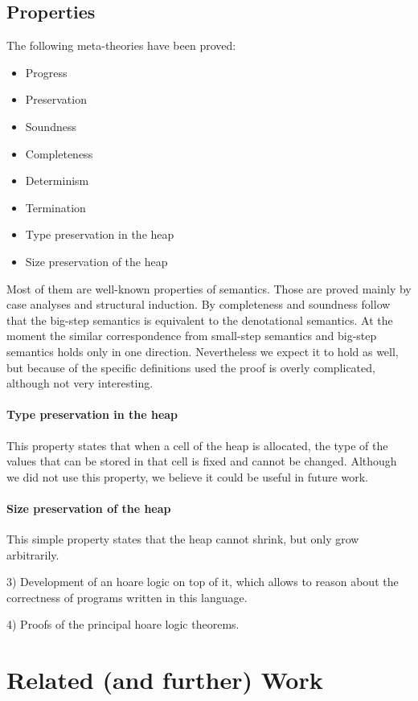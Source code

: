 \documentclass[12pt, a4paper, oneside]{article}
\begin{document}
\subsection{Properties}
\label{sec:metatheories}
The following meta-theories have been proved:
\begin{itemize}
	\item Progress
	\item Preservation
	\item Soundness
	\item Completeness
	\item Determinism
	\item Termination
	\item Type preservation in the heap
	\item Size preservation of the heap
\end{itemize}

Most of them are well-known properties of semantics. Those are proved mainly by case analyses and structural induction. By completeness and soundness follow that the big-step semantics is equivalent to the denotational semantics. At the moment the similar correspondence from small-step semantics and big-step semantics holds only in one direction. Nevertheless we expect it to hold as well, but because of the specific definitions used the proof is overly complicated, although not very interesting.

\paragraph{Type preservation in the heap}
This property states that when a cell of the heap is allocated, the type of the values that can be stored in that cell is fixed and cannot be changed. Although we did not use this property, we believe it could be useful in future work.

\paragraph{Size preservation of the heap}
This simple property states that the heap cannot shrink, but only grow arbitrarily.

3) Development of an hoare logic on top of it, which allows to reason about the correctness of programs written in this language. 

4) Proofs of the principal hoare logic theorems.


\section{Related (and further) Work}
\end{document}
